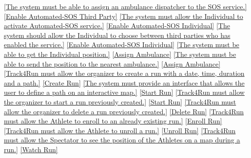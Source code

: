 \documentclass[a4paper]{article}
\begin{document}
\begin{traceabilitymatrix}
                {\ref{The system must be able to assign an ambulance dispatcher to the SOS service.}}
                {\ref{Enable Automated-SOS Third Party}}
                {}
            \con{\ref{The Individual shall be able to activate Automated-SOS service.}}
                {\ref{The system must allow the Individual to activate Automated-SOS service.}}
                {\ref{Enable Automated-SOS Individual}}
                {}
            \con{\ref{The Individual shall be able to activate Automated-SOS service.}}
                {\ref{The system should allow the Individual to choose between third parties who has enabled the service.}}
                {\ref{Enable Automated-SOS Individual}}
                {}
            \con{\ref{The Dispatcher shall be able to assign an ambulance to an incident.}}
                {\ref{The system must be able to get the Individual position.}}
                {\ref{Assign Ambulance}}
                {}
                \con{\ref{The Dispatcher shall be able to assign an ambulance to an incident.}}
                {\ref{The system must be able to send the position to the nearest ambulance.}}
                {\ref{Assign Ambulance}}
                {}
            \con{\ref{The Organizer shall be able to create a run.}}
                {\ref{Track4Run must allow the organizer to create a run with a date, time, duration and a path.}}
                {\ref{Create Run}}
                {}
                \con{\ref{The Organizer should be able to start a run.}}
                {\ref{The system must provide an interface that allows the user to define a path on an interactive map.}}
                {\ref{Start Run}}
                {}
            \con{\ref{The Organizer should be able to start a run.}}
                {\ref{Track4Run must allow the organizer to start a run previously created.}}
                {\ref{Start Run}}
                {}
            \con{\ref{The Organizer should be able to delete a run.}}
                {\ref{Track4Run must allow the organizer to delete a run previously created.}}
                {\ref{Delete Run}}
                {}
            \con{\ref{The Athlete should be able to enroll a run.}}
                {\ref{Track4Run must allow the Athlete to enroll to an already existing run.}}
                {\ref{Enroll Run}}
                {}
            \con{\ref{The Athlete should be able to unroll a run.}}
                {\ref{Track4Run must allow the Athlete to unroll a run.}}
                {\ref{Unroll Run}}
                {}
            \con{\ref{The Spectator should be able to watch a run.}}
                {\ref{Track4Run must allow the Spectator to see the position of the Athletes on a map during a run.}}
                {\ref{Watch Run}}
                {}
        \end{traceabilitymatrix}
        
\end{document}
